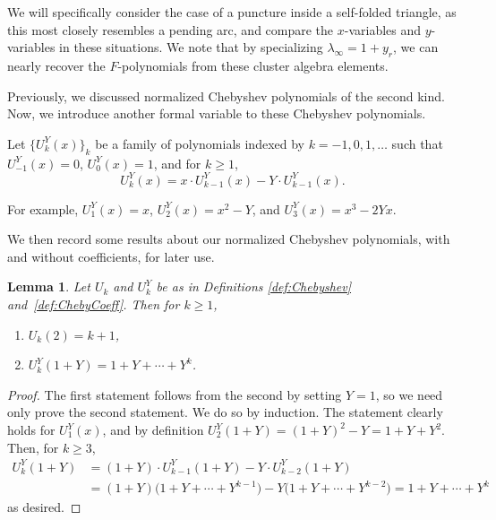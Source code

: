 \documentclass[pdftex]{sigma}%
\numberwithin{equation}{section}
\newtheorem{Lemma}[Theorem]{Lemma}
\begin{document}
We will specifically consider the case of a puncture inside a self-folded triangle, as this most closely resembles a pending arc, and compare the $x$-variables and $y$-variables in these situations. We note that by specializing $\lambda_\infty = 1 + y_r $, we can nearly recover the $F$-polynomials from these cluster algebra elements.

Previously, we discussed normalized Chebyshev polynomials of the second kind. Now, we introduce another formal variable to these Chebyshev polynomials.

\begin{Definition}\label{def:ChebyCoeff}
Let $\big\{U_k^Y(x)\big\}_k$ be a family of polynomials indexed by $k = -1,0,1,\ldots$ such that $U_{-1}^Y(x) = 0$, $U_0^Y(x) = 1$, and for $k \geq 1$, \[
U_k^Y(x) = x\cdot U_{k-1}^Y(x) - Y\cdot U_{k-1}^Y(x).
\]
\end{Definition}

For example, $U_1^Y(x) = x$, $U_2^Y(x) = x^2 - Y$, and $U_3^Y(x) = x^3 - 2Yx$.

We then record some results about our normalized Chebyshev polynomials, with and without coefficients, for later use.
\begin{Lemma}\samepage
Let $U_k$ and $U_k^Y$ be as in Definitions {\rm \ref{def:Chebyshev}} and~{\rm \ref{def:ChebyCoeff}}. Then for $k \geq 1$,
\begin{enumerate}\itemsep=0pt
\item[$1)$] $U_k(2) = k+1$,
\item[$2)$] $U_k^Y(1 + Y) = 1 + Y + \cdots + Y^k$.
\end{enumerate}
\end{Lemma}

\begin{proof}The first statement follows from the second by setting $Y=1$, so we need only prove the second statement. We do so by induction. The statement clearly holds for $U_1^Y(x)$, and by definition $U_2^Y(1+Y) = (1+Y)^2 - Y = 1 + Y + Y^2$. Then, for $k \geq 3$,
\begin{align*}
 U_k^Y(1+Y) &= (1+Y)\cdot U_{k-1}^Y(1+Y) - Y\cdot U_{k-2}^Y(1+Y) \\
 &= (1+Y)\big(1+Y + \cdots + Y^{k-1}\big) - Y\big(1+Y + \cdots + Y^{k-2}\big) = 1 + Y + \cdots + Y^k
\end{align*}
as desired.
\end{proof}
\end{document}
